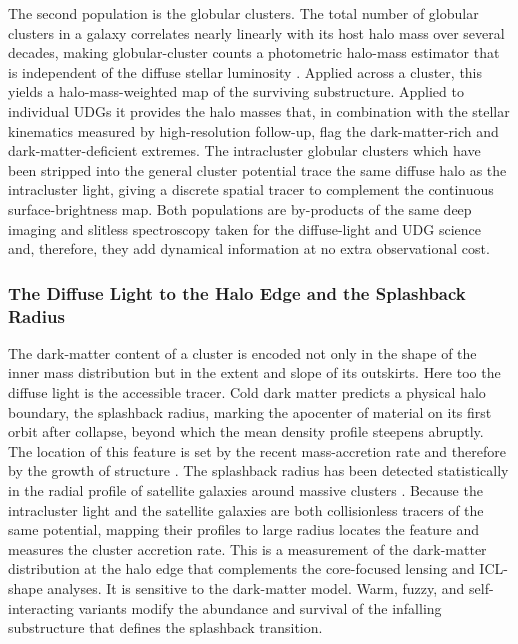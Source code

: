 \documentclass[10pt,onecolumn]{article}
\begin{document}
The second population is the globular clusters. The total number of globular clusters in a galaxy correlates nearly linearly with its host halo mass over several decades, making globular-cluster counts a photometric halo-mass estimator that is independent of the diffuse stellar luminosity \cite{harris2013}. Applied across a cluster, this yields a halo-mass-weighted map of the surviving substructure. Applied to individual UDGs it provides the halo masses that, in combination with the stellar kinematics measured by high-resolution follow-up, flag the dark-matter-rich and dark-matter-deficient extremes. The intracluster globular clusters which have been stripped into the general cluster potential trace the same diffuse halo as the intracluster light, giving a discrete spatial tracer to complement the continuous surface-brightness map. Both populations are by-products of the same deep imaging and slitless spectroscopy taken for the diffuse-light and UDG science and, therefore, they add dynamical information at no extra observational cost.

\subsubsection{The Diffuse Light to the Halo Edge and the Splashback Radius}

The dark-matter content of a cluster is encoded not only in the shape of the inner mass distribution but in the extent and slope of its outskirts. Here too the diffuse light is the accessible tracer. Cold dark matter predicts a physical halo boundary, the splashback radius, marking the apocenter of material on its first orbit after collapse, beyond which the mean density profile steepens abruptly. The location of this feature is set by the recent mass-accretion rate and therefore by the growth of structure \cite{more2015}. The splashback radius has been detected statistically in the radial profile of satellite galaxies around massive clusters \cite{more2016}. Because the intracluster light and the satellite galaxies are both collisionless tracers of the same potential, mapping their profiles to large radius locates the feature and measures the cluster accretion rate. This is a measurement of the dark-matter distribution at the halo edge that complements the core-focused lensing and ICL-shape analyses. It is sensitive to the dark-matter model. Warm, fuzzy, and self-interacting variants modify the abundance and survival of the infalling substructure that defines the splashback transition.
\end{document}
